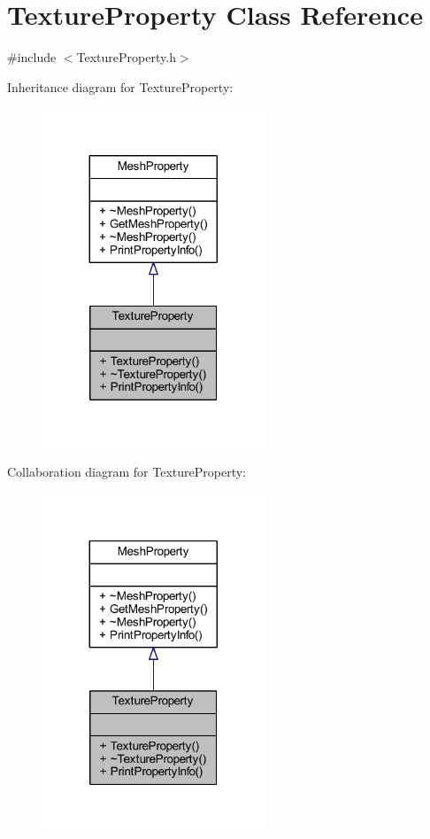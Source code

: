 \hypertarget{class_texture_property}{}\section{Texture\+Property Class Reference}
\label{class_texture_property}


{\ttfamily \#include $<$Texture\+Property.\+h$>$}



Inheritance diagram for Texture\+Property\+:
\nopagebreak
\begin{figure}[H]
\begin{center}
\leavevmode
\includegraphics[width=188pt]{class_texture_property__inherit__graph}
\end{center}
\end{figure}


Collaboration diagram for Texture\+Property\+:
\nopagebreak
\begin{figure}[H]
\begin{center}
\leavevmode
\includegraphics[width=188pt]{class_texture_property__coll__graph}
\end{center}
\end{figure}
